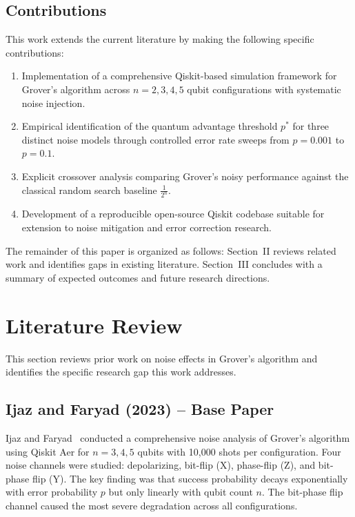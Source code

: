 \documentclass[conference]{IEEEtran}
\begin{document}
\subsection{Contributions}

This work extends the current literature by making the following specific
contributions:

\begin{enumerate}
  \item Implementation of a comprehensive Qiskit-based simulation framework for
        Grover's algorithm across $n = 2, 3, 4, 5$ qubit configurations with
        systematic noise injection.

  \item Empirical identification of the quantum advantage threshold $p^{*}$ for
        three distinct noise models through controlled error rate sweeps from
        $p = 0.001$ to $p = 0.1$.

  \item Explicit crossover analysis comparing Grover's noisy performance against
        the classical random search baseline $\frac{1}{2^{n}}$.

  \item Development of a reproducible open-source Qiskit codebase suitable for
        extension to noise mitigation and error correction research.
\end{enumerate}

The remainder of this paper is organized as follows: Section~II reviews related
work and identifies gaps in existing literature. Section~III concludes with a
summary of expected outcomes and future research directions.

\section{Literature Review}

This section reviews prior work on noise effects in Grover's algorithm and
identifies the specific research gap this work addresses.

\subsection{Ijaz and Faryad (2023) -- Base Paper}

Ijaz and Faryad~\cite{ijaz2023} conducted a comprehensive noise analysis of
Grover's algorithm using Qiskit Aer for $n = 3, 4, 5$ qubits with 10{,}000 shots
per configuration. Four noise channels were studied: depolarizing, bit-flip (X),
phase-flip (Z), and bit-phase flip (Y). The key finding was that success
probability decays exponentially with error probability $p$ but only linearly with
qubit count $n$. The bit-phase flip channel caused the most severe degradation
across all configurations.
\end{document}
